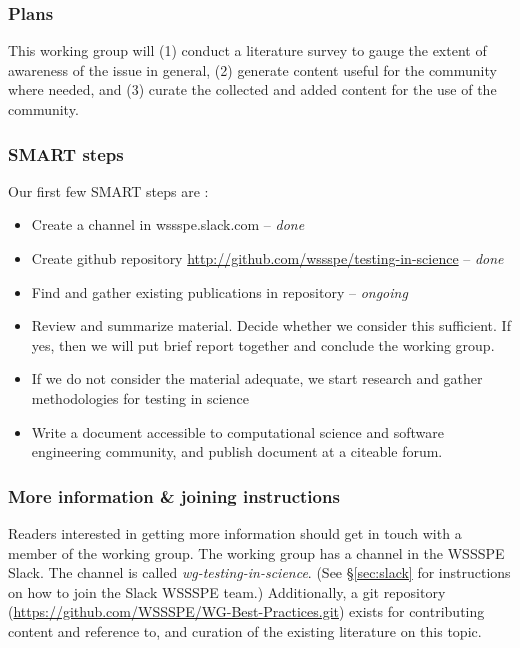 \subsubsection{Plans}

This working group will (1) conduct a literature survey to gauge the extent
of awareness of the issue in general, (2) generate content useful for
the community where needed, and (3) curate the collected and added
content for the use of the community.


\subsubsection{SMART steps}

Our first few SMART steps are : 
\begin{itemize}
\item Create a channel in wssspe.slack.com -- {\em done}
\item Create github repository
  {\url{http://github.com/wssspe/testing-in-science}} -- {\em done}
\item Find and gather existing publications in repository -- {\em ongoing}
\item Review and summarize material. Decide whether we consider this
  sufficient. If yes, then we will put brief report together and
  conclude the working group.
\item If we do not consider the material adequate, we start research
  and gather methodologies for testing in science 
\item Write a document accessible to computational science and
  software engineering community, and publish document at a citeable forum.
\end{itemize}

\subsubsection{More information \& joining instructions}

Readers interested in getting more information should get in touch
with a member of the working group. The working group
has a channel in the WSSSPE Slack. The channel is called
{\it wg-testing-in-science}.
(See \S\ref{sec:slack} for instructions on how to join the Slack WSSSPE team.)
Additionally, a git
repository (\url{https://github.com/WSSSPE/WG-Best-Practices.git}) exists for contributing content and reference to, and
curation of the existing literature on this topic.